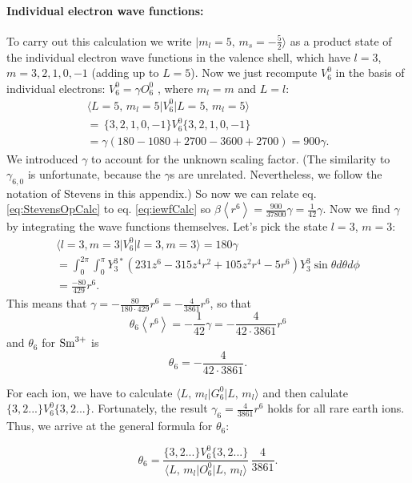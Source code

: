 \documentclass[twocolumn,english,prb]{revtex4-2}
\begin{document}
\paragraph*{Individual electron wave functions: }
To carry out this calculation we write $\lvert m_{l}=5,\,m_{s}=-\frac{5}{2}\rangle$ as a product
state of the individual electron wave functions in the valence shell,
which have $l=3$, $m=3,2,1,0,-1$ (adding up to $L=5$). Now we just recompute
$V_{6}^{0}$ in the basis of individual electrons: $V_{6}^{0}=\gamma O_{6}^{0}$
, where $m_{l}=m$ and $L=l$:
\begin{multline}
\langle L=5,\,m_{l}=5\rvert V_{6}^{0}\lvert L=5,\,m_{l}=5\rangle \\
=\,\{3,2,1,0,-1\}V_{6}^{0}\{3,2,1,0,-1\}\\
=\gamma(180-1080+2700-3600+2700)=900\gamma.
\label{eq:iewfCalc}
\end{multline}
We introduced $\gamma$ to account for the unknown scaling factor. (The similarity to $\gamma_{6,0}$ is unfortunate, because the $\gamma$s are unrelated. Nevertheless, we follow the notation of Stevens in this appendix.) So now we can relate eq. \ref{eq:StevensOpCalc}  to eq. \ref{eq:iewfCalc} so $\beta\left\langle r^{6}\right\rangle =\frac{900}{37800}\gamma=\frac{1}{42}\gamma$.
Now we find $\gamma$ by integrating the wave functions themselves. Let's pick the state $l=3$, $m=3$:
\begin{multline}
\langle l=3,m=3\rvert V_{6}^{0}\lvert l=3,m=3\rangle=180\gamma \\ =\int_{0}^{2\pi}\int_{0}^{\pi}Y_{3}^{3*}(231z^{6}-315z^{4}r^{2}+105z^{2}r^{4}-5r^{6})Y_{3}^{3}\sin\theta d\theta d\phi\\
=\frac{-80}{429}r^{6}.
\end{multline}
This means that $\gamma=-\frac{80}{180\cdot429}r^{6}=-\frac{4}{3861}r^{6}$, so that
\begin{equation}
\theta_{6}\left\langle r^{6}\right\rangle =-\frac{1}{42}\gamma=-\frac{4}{42\cdot3861}r^{6}
\end{equation}
and $\theta_6$ for ${\rm Sm}^{3+}$ is
\begin{equation}
\theta_{6}=-\frac{4}{42\cdot3861}.
\end{equation}


For each ion, we have to calculate $\langle L,\,m_{l}\rvert G_{6}^{0}\lvert L,\,m_{l}\rangle$
and then calulate $\{3,2...\}V_{6}^{0}\{3,2...\}$. Fortunately, the
result $\gamma_{6}=\frac{4}{3861}r^{6}$ holds for all rare earth
ions. Thus, we arrive at the general formula for $\theta_6$:

\begin{equation}
\theta_{6}=\frac{\{3,2...\}V_{6}^{0}\{3,2...\}}{\langle L,\,m_{l}\rvert O_{6}^{0}\lvert L,\,m_{l}\rangle}\,\frac{4}{3861}.
\end{equation}




\end{document}
